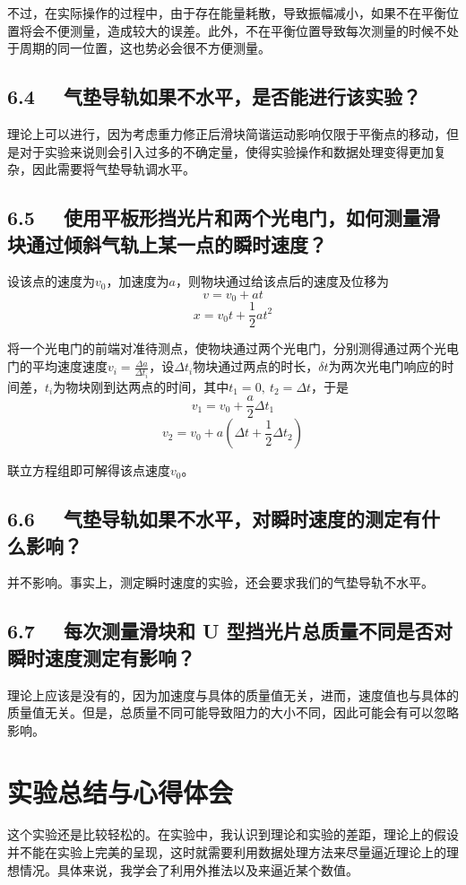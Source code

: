 \documentclass[11pt]{article}
\begin{document}
	不过，在实际操作的过程中，由于存在能量耗散，导致振幅减小，如果不在平衡位置将会不便测量，造成较大的误差。此外，不在平衡位置导致每次测量的时候不处于周期的同一位置，这也势必会很不方便测量。
	
	\subsection*{6.4 \ \  气垫导轨如果不水平，是否能进行该实验？}
	理论上可以进行，因为考虑重力修正后滑块简谐运动影响仅限于平衡点的移动，但是对于实验来说则会引入过多的不确定量，使得实验操作和数据处理变得更加复杂，因此需要将气垫导轨调水平。
	
	\subsection*{6.5 \ \  使用平板形挡光片和两个光电门，如何测量滑块通过倾斜气轨上某一点的瞬时速度？}
	
	设该点的速度为$v_0$，加速度为$a$，则物块通过给该点后的速度及位移为
	\[v=v_0+a t\]
	\[x=v_0 t+\frac{1}{2}at^2\]
	
	将一个光电门的前端对准待测点，使物块通过两个光电门，分别测得通过两个光电门的平均速度速度$v_i=\frac{\Delta a}{\Delta t_i}$，设$\Delta t_i$物块通过两点的时长，$\delta t$为两次光电门响应的时间差，$t_i$为物块刚到达两点的时间，其中$t_1=0,\ t_2=\Delta t$，于是
	\[v_1=v_0+\frac{a}{2}\Delta t_1\]
	\[v_2=v_0+a(\Delta t+\frac{1}{2}\Delta t_2)\]
	
	联立方程组即可解得该点速度$v_0$。
	
	\subsection*{6.6 \ \ 气垫导轨如果不水平，对瞬时速度的测定有什么影响？}
	
	并不影响。事实上，测定瞬时速度的实验，还会要求我们的气垫导轨不水平。
	
	\subsection*{6.7 \ \ 每次测量滑块和 U 型挡光片总质量不同是否对瞬时速度测定有影响？}
	理论上应该是没有的，因为加速度与具体的质量值无关，进而，速度值也与具体的质量值无关。但是，总质量不同可能导致阻力的大小不同，因此可能会有可以忽略影响。
	
	\section{实验总结与心得体会}
	这个实验还是比较轻松的。在实验中，我认识到理论和实验的差距，理论上的假设并不能在实验上完美的呈现，这时就需要利用数据处理方法来尽量逼近理论上的理想情况。具体来说，我学会了利用外推法以及来逼近某个数值。
	
\end{document}
